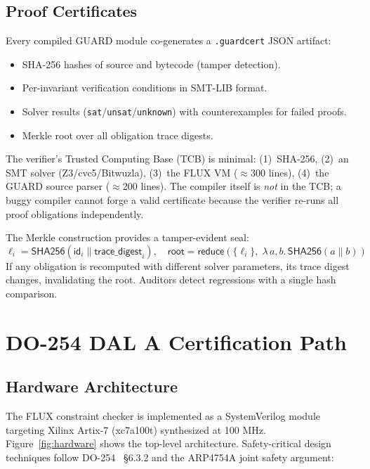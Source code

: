 \documentclass[sigplan,10pt,review]{acmart}
\begin{document}
\subsection{Proof Certificates}

Every compiled GUARD module co-generates a \texttt{.guardcert} JSON artifact:
\begin{itemize}
  \item SHA-256 hashes of source and bytecode (tamper detection).
  \item Per-invariant verification conditions in SMT-LIB format.
  \item Solver results (\texttt{sat}/\texttt{unsat}/\texttt{unknown}) with
    counterexamples for failed proofs.
  \item Merkle root over all obligation trace digests.
\end{itemize}

The verifier's Trusted Computing Base (TCB) is minimal:
(1)~SHA-256, (2)~an SMT solver (Z3/cvc5/Bitwuzla),
(3)~the FLUX VM ($\approx$300 lines), (4)~the GUARD source parser ($\approx$200 lines).
The compiler itself is \emph{not} in the TCB; a buggy compiler cannot forge a
valid certificate because the verifier re-runs all proof obligations independently.

The Merkle construction provides a tamper-evident seal:
\[
  \ell_i = \mathsf{SHA256}(\mathsf{id}_i \| \mathsf{trace\_digest}_i), \quad
  \mathsf{root} = \mathsf{reduce}(\{\ell_i\},\; \lambda\,a,b.\, \mathsf{SHA256}(a\|b))
\]
If any obligation is recomputed with different solver parameters, its trace digest
changes, invalidating the root. Auditors detect regressions with a single hash comparison.

\section{DO-254 DAL A Certification Path}
\label{sec:hardware}

\subsection{Hardware Architecture}

The FLUX constraint checker is implemented as a SystemVerilog module targeting
Xilinx Artix-7 (xc7a100t) synthesized at 100 MHz. Figure~\ref{fig:hardware} shows
the top-level architecture. Safety-critical design techniques follow
DO-254~\cite{do254} \S6.3.2 and the ARP4754A joint safety argument:
\end{document}
